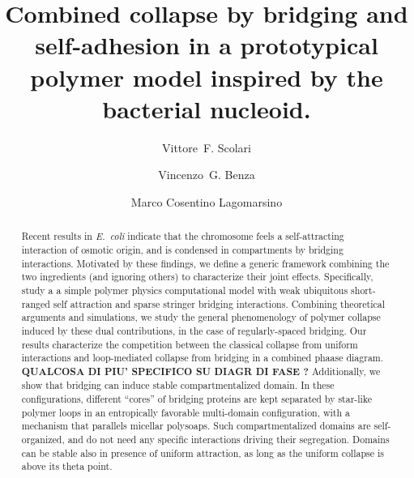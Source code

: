 \documentclass[a4paper,12pt,pre,superscriptaddress]{revtex4}
\begin{document}
 

\title{Combined collapse by bridging and self-adhesion in a
  prototypical polymer model inspired by the bacterial nucleoid.}

\author{Vittore~F. Scolari}
%
% 
%
\author{Vincenzo~G. Benza}
%
%
\author{Marco Cosentino Lagomarsino}
%

\begin{abstract}
  Recent results in \emph{E.~coli} indicate that the chromosome feels
  a self-attracting interaction of osmotic origin, and is condensed in
  compartments by bridging interactions.
  Motivated by these findings, we define a generic framework combining
  the two ingredients (and ignoring others) to characterize their
  joint effects. Specifically, study a a simple polymer physics
  computational model with weak ubiquitous short-ranged self
  attraction and sparse stringer bridging interactions.  Combining
  theoretical arguments and simulations, we study the general
  phenomenology of polymer collapse induced by these dual
  contributions, in the case of regularly-spaced bridging.
%
  Our results characterize the competition between the classical
  collapse from uniform interactions and loop-mediated collapse from
  bridging in a combined phaase diagram.
%
  \textbf{ QUALCOSA DI PIU' SPECIFICO SU DIAGR DI FASE ?}
%
  Additionally, we show that bridging can induce stable
  compartmentalized domain. In these configurations, different
  ``cores'' of bridging proteins are kept separated by star-like
  polymer loops in an entropically favorable multi-domain
  configuration, with a mechanism that parallels micellar polysoaps.
  Such compartmentalized domains are self-organized, and do not need
  any specific interactions driving their segregation.  Domains can be
  stable also in presence of uniform attraction, as long as the
  uniform collapse is above its theta point.
\end{abstract}
\end{document}
